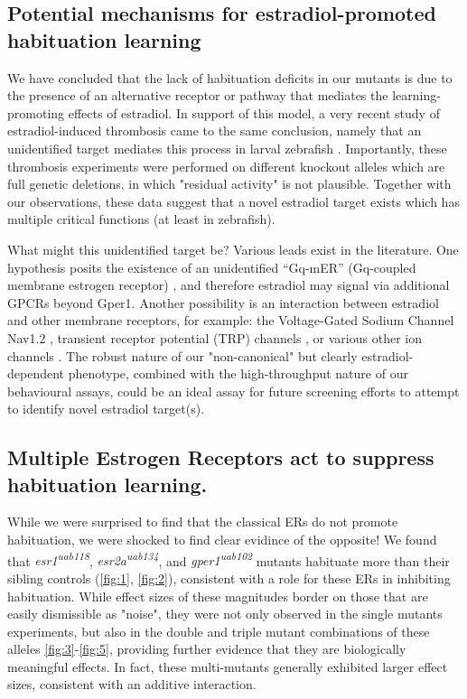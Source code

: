 \documentclass[9pt,lineno]{RandlettLab_elife}
\begin{document}
{\subsection{Potential mechanisms for estradiol-promoted habituation learning}

We have concluded that the lack of habituation deficits in our mutants is due to the presence of an alternative receptor or pathway that mediates the learning-promoting effects of estradiol.
In support of this model, a very recent study of estradiol-induced thrombosis came to the same conclusion, namely that an unidentified target mediates this process in larval zebrafish \citep{Yu2024-hr}.
Importantly, these thrombosis experiments were performed on different knockout alleles which are full genetic deletions, in which "residual activity" is not plausible. 
Together with our observations, these data suggest that a novel estradiol target exists which has multiple critical functions (at least in zebrafish). 

What might this unidentified target be? 
Various leads exist in the literature. 
One hypothesis posits the existence of an unidentified “Gq-mER” (Gq-coupled membrane estrogen receptor) \citep{Qiu2006-ml, Vail2019-lx}, and therefore estradiol may signal via additional GPCRs beyond Gper1. 
Another possibility is an interaction between estradiol and other membrane receptors, for example: the Voltage-Gated Sodium Channel Nav1.2 \citep{Sula2021-vs, Trevino2021-wl}, transient receptor potential (TRP) channels \citep{Payrits2017-cd, Ramirez-Barrantes2020-iv}, or various other ion channels \citep{Kow2016-dl}.
The robust nature of our "non-canonical" but clearly estradiol-dependent phenotype, combined with the high-throughput nature of our behavioural assays, could be an ideal assay for future screening efforts to attempt to identify novel estradiol target(s). 

\subsection{Multiple Estrogen Receptors act to suppress habituation learning.}
 
While we were surprised to find that the classical ERs do not promote habituation, we were shocked to find clear evidince of the opposite!
We found that \emph{esr1\textsuperscript{uab118}}, \emph{esr2a\textsuperscript{uab134}},  and \emph{gper1\textsuperscript{uab102}} mutants habituate more than their sibling controls (\autoref{fig:1}, \autoref{fig:2}), consistent with a role for these ERs in inhibiting habituation.
While effect sizes of these magnitudes border on those that are easily dismissible as "noise", they were not only observed in the single mutants experiments, but also in the double and triple mutant combinations of these alleles {\autoref{fig:3}-\autoref{fig:5}}, providing further evidence that they are biologically meaningful effects. 
In fact, these multi-mutants generally exhibited larger effect sizes, consistent with an additive interaction. 
 
}
\end{document}
